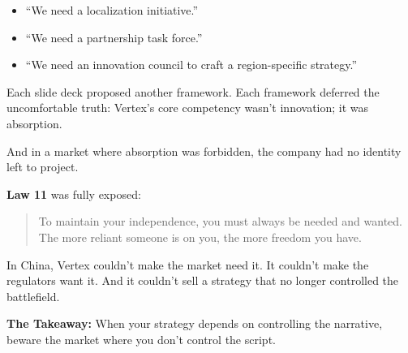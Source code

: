 \begin{itemize}
  \item “We need a localization initiative.”
  \item “We need a partnership task force.”
  \item “We need an innovation council to craft a region-specific strategy.”
\end{itemize}

Each slide deck proposed another framework.  Each framework deferred the uncomfortable truth:  Vertex’s core competency wasn’t innovation; it was absorption.

And in a market where absorption was forbidden, the company had no identity left to project.

\textbf{Law 11} was fully exposed:

\begin{quote}
To maintain your independence, you must always be needed and wanted. The more reliant someone is on you, the more freedom you have.
\end{quote}

In China, Vertex couldn’t make the market need it.  It couldn’t make the regulators want it. And it couldn’t sell a strategy that no longer controlled the battlefield.

\textbf{The Takeaway:}  When your strategy depends on controlling the narrative, beware the market where you don’t control the script.